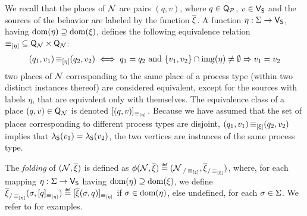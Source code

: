 We recall that the places of $\mathcal{N}$ are pairs $(q,v)$, where $q
\in \mathsf{Q}_{\mathcal{P}}$, $v \in \mathsf{V}_{\mathsf{S}}$ and the sources of the
behavior are labeled by the function $\overline{\xi}$. A function
$\eta : \Sigma \rightarrow \mathsf{V}_{\mathsf{S}}$, having ${\mathrm{dom}({\eta})}
\supseteq {\mathrm{dom}({\xi})}$, defines the following equivalence relation
$\operatorname{{\equiv}}_{[\eta]} \subseteq \mathsf{Q}_{\mathcal{N}} \times
\mathsf{Q}_{\mathcal{N}}$:
\begin{align}\label{eq:foldrel}
  (q_1,v_1) \operatorname{{\equiv}}_{[\eta]} (q_2,v_2) \iff
  q_1 = q_2 \text{ and } {\{ {v_1,v_2} \}} \cap {\mathrm{img}({\eta})} \neq \emptyset \Rightarrow v_1 = v_2
\end{align}
\ie two places of $\mathcal{N}$ corresponding to the same place of a
process type (within two distinct instances thereof) are considered
equivalent, except for the sources with labels $\eta$, that are
equivalent only with themselves. The equivalence class of a place
$(q,v) \in \mathsf{Q}_{\mathcal{N}}$ is denoted
$[(q,v)]_{\operatorname{{\equiv}}_{[\eta]}}$.
Because we have assumed that the set
of places corresponding to different process types are disjoint,
$(q_1,v_1) \operatorname{{\equiv}}_{[\xi]} (q_2,v_2)$ implies that
$\lambda_{\mathsf{S}}(v_1) = \lambda_{\mathsf{S}}(v_2)$, \ie the two vertices are
instances of the same process type.

The \emph{folding} of $(\mathcal{N},\overline{\xi})$ is defined
as $\phi({\mathcal{N},\overline{\xi}}) \stackrel{\scriptscriptstyle{\mathsf{def}}}{=}
({\mathcal{N}}_{~/\operatorname{{\equiv}}_{[\xi]}},{\overline{\xi}}_{/\operatorname{{\equiv}}_{[\xi]}})$,
where, for each mapping $\eta : \Sigma \rightarrow
\mathsf{V}_{\mathsf{S}}$ having ${\mathrm{dom}({\eta})} \supseteq {\mathrm{dom}({\xi})}$, we
define $\overline{\xi}_{/\operatorname{{\equiv}}_{[\eta]}}(\sigma,
[q]_{\operatorname{{\equiv}}_{[\eta]}}) \stackrel{\scriptscriptstyle{\mathsf{def}}}{=}
[\overline{\xi}(\sigma,q)]_{\operatorname{{\equiv}}_{[\eta]}}$ if $\sigma \in
{\mathrm{dom}({\eta})}$, else undefined, for each $\sigma \in \Sigma$. We
refer to  for examples.




